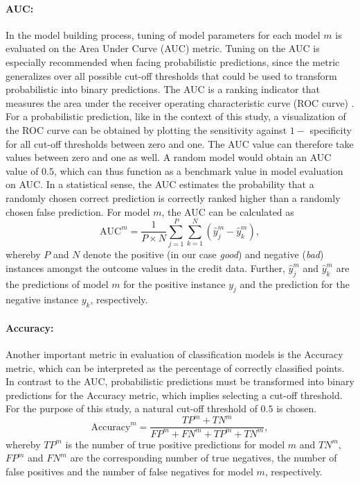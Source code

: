 \documentclass[12pt]{article}
\begin{document}
\paragraph{AUC:} In the model building process, tuning of model parameters for each model $m$ is evaluated on the Area Under Curve (AUC) metric. Tuning on the AUC is especially recommended when facing probabilistic predictions, since the metric generalizes over all possible cut-off thresholds that could be used to transform probabilistic into binary predictions. The AUC is a ranking indicator that measures the area under the receiver operating characteristic curve (ROC curve) \citep{hanley1982meaning}. For a probabilistic prediction, like in the context of this study, a visualization of the ROC curve can be obtained by plotting the sensitivity against $1 -$ specificity for all cut-off thresholds between zero and one. The AUC value can therefore take values between zero and one as well. A random model would obtain an AUC value of $0.5$, which can thus function as a benchmark value in model evaluation on AUC. In a statistical sense, the AUC estimates the probability that a randomly chosen correct prediction is correctly ranked higher than a randomly chosen false prediction. For model $m$, the AUC can be calculated as
\begin{equation}
\text{AUC}^m = \frac{1}{P \times N}\sum_{j=1}^{P}\sum_{k=1}^{N}(\hat{y}^m_j - \hat{y}^m_k),
\end{equation}
whereby $P$ and $N$ denote the positive (in our case \textit{good}) and negative (\textit{bad}) instances amongst the outcome values in the credit data. Further, $\hat{y}^m_j$ and $\hat{y}^m_k$ are the predictions of model $m$ for the positive instance $y_j$ and the prediction for the negative instance $y_k$, respectively.

\paragraph{Accuracy:} Another important metric in evaluation of classification models is the Accuracy metric, which can be interpreted as the percentage of correctly classified points. In contrast to the AUC, probabilistic predictions must be transformed into binary predictions for the Accuracy metric, which implies selecting a cut-off threshold. For the purpose of this study, a natural cut-off threshold of $0.5$ is chosen.
\begin{equation}
\text{Accuracy}^m = \frac{TP^m + TN^m}{FP^m + FN^m + TP^m + TN^m},
\end{equation}
whereby $TP^m$ is the number of true positive predictions for model $m$ and $TN^m$, $FP^m$ and $FN^m$ are the corresponding number of true negatives, the number of false positives and the number of false negatives for model $m$, respectively.
\end{document}
